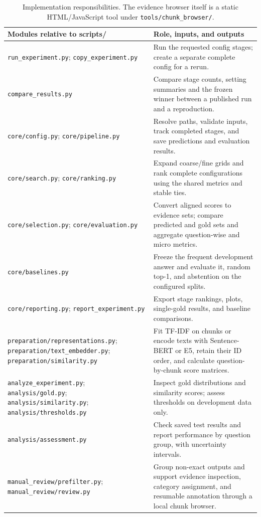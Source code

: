 \documentclass[11pt]{article}
\begin{document}
\begin{table}[t]
\centering
\small
\begin{tabular}{@{}>{\raggedright\arraybackslash}p{}>{\raggedright\arraybackslash}p{}@{}}
\toprule
\textbf{Modules relative to scripts/} & \textbf{Role, inputs, and outputs} \\
\midrule
\nolinkurl{run_experiment.py}; \nolinkurl{copy_experiment.py} & Run the requested config stages; create a separate complete config for a rerun. \\
\nolinkurl{compare_results.py} & Compare stage counts, setting summaries and the frozen winner between a published run and a reproduction. \\
\nolinkurl{core/config.py}; \nolinkurl{core/pipeline.py} & Resolve paths, validate inputs, track completed stages, and save predictions and evaluation results. \\
\nolinkurl{core/search.py}; \nolinkurl{core/ranking.py} & Expand coarse/fine grids and rank complete configurations using the shared metrics and stable ties. \\
\nolinkurl{core/selection.py}; \nolinkurl{core/evaluation.py} & Convert aligned scores to evidence sets; compare predicted and gold sets and aggregate question-wise and micro metrics. \\
\nolinkurl{core/baselines.py} & Freeze the frequent development answer and evaluate it, random top-1, and abstention on the configured splits. \\
\nolinkurl{core/reporting.py}; \nolinkurl{report_experiment.py} & Export stage rankings, plots, single-gold results, and baseline comparisons. \\
\nolinkurl{preparation/representations.py}; \nolinkurl{preparation/text_embedder.py}; \nolinkurl{preparation/similarity.py} & Fit TF-IDF on chunks or encode texts with Sentence-BERT or E5, retain their ID order, and calculate question-by-chunk score matrices. \\
\nolinkurl{analyze_experiment.py}; \nolinkurl{analysis/gold.py}; \nolinkurl{analysis/similarity.py}; \nolinkurl{analysis/thresholds.py} & Inspect gold distributions and similarity scores; assess thresholds on development data only. \\
\nolinkurl{analysis/assessment.py} & Check saved test results and report performance by question group, with uncertainty intervals. \\
\nolinkurl{manual_review/prefilter.py}; \nolinkurl{manual_review/review.py} & Group non-exact outputs and support evidence inspection, category assignment, and resumable annotation through a local chunk browser. \\
\bottomrule
\end{tabular}
\caption{Implementation responsibilities. The evidence browser itself is a static HTML/JavaScript tool under \texttt{tools/chunk\_browser/}.}
\label{tab:modules}
\end{table}
\end{document}
